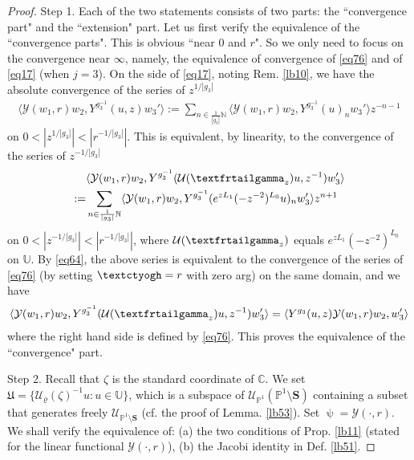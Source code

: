 \documentclass[12pt,a4paper,notitlepage]{article}
\theoremstyle{definition}
\theoremstyle{plain}
\newcommand{\fk}{\mathfrak}
\newcommand{\mc}{\mathcal}
\newcommand{\bk}[1]{\langle {#1}\rangle}
\newcommand{\scr}{\mathscr}
\newcommand{\Ubb}{\mathbb U}
\newcommand{\Cbb}{\mathbb C}
\newcommand{\Nbb}{\mathbb N}
\newcommand{\Pbb}{\mathbb P}
\newcommand{\Sbf}{\mathbf{S}}
\newcommand{\tipaz}{\text{\textctyogh}}
\newcommand{\tipxgamma}{\text{\textfrtailgamma}}
\numberwithin{equation}{subsection}
\begin{document}
\begin{proof}
Step 1. Each of the two statements consists of two parts: the ``convergence part" and the ``extension" part. Let us first verify the equivalence of the ``convergence parts". This is obvious ``near $0$ and $r$". So we only need to focus on the convergence  near $\infty$, namely, the equivalence of convergence of \eqref{eq76} and of \eqref{eq17} (when $j=3$). On the side of \eqref{eq17}, noting Rem. \ref{lb10}, we have the absolute  convergence of the series of $z^{1/|g_3|}$
\begin{align*}
\bk{\mc Y(w_1,r)w_2,Y^{g_3^{-1}}(u,z)w_3'}:=\sum_{n\in\frac 1{|g_3|}\Nbb}	\bk{\mc Y(w_1,r)w_2,Y^{g_3^{-1}}(u)_nw_3'}z^{-n-1}	
\end{align*}
on $0<|z^{1/|g_3|}|<|r^{-1/|g_3|}|$. This is equivalent, by linearity, to the convergence  of the series of $z^{-1/|g_3|}$
\begin{align*}
&\bk{\mc Y(w_1,r)w_2,Y^{g_3^{-1}}(\mc U(\tipxgamma_z)u,z^{-1})w_3'}\\
:=&\sum_{n\in\frac 1{|g_3|}\Nbb}	\bk{\mc Y(w_1,r)w_2,Y^{g_3^{-1}}(e^{zL_1}(-z^{-2})^{L_0}u)_nw_3'}z^{n+1}	
\end{align*}
on $0<|z^{-1/|g_3|}|<|r^{-1/|g_3|}|$, where $\mc U(\tipxgamma_z)$ equals $e^{zL_1}(-z^{-2})^{L_0}$ on $\Ubb$. By \eqref{eq64}, the above series is equivalent to the convergence of the series of \eqref{eq76} (by setting $\tipaz=r$ with zero arg) on the same domain, and we have
\begin{align}
\bk{\mc Y(w_1,r)w_2,Y^{g_3^{-1}}(\mc U(\tipxgamma_z)u,z^{-1})w_3'}=	\bk{Y^{g_3}(u,z)\mc Y(w_1,r)w_2,w_3'}\label{eq83}
\end{align}
where the right hand side is defined by \eqref{eq76}. This proves the equivalence of the ``convergence" part.

Step 2. Recall that $\zeta$ is the standard coordinate of $\Cbb$. We set $\fk U=\{\mc U_\varrho(\zeta)^{-1}u:u\in\Ubb\}$, which is a subspace of $\scr U_{\Pbb^1}(\Pbb^1\setminus\Sbf)$ containing a subset that generates freely $\scr U_{\Pbb^1\setminus\Sbf}$ (cf. the proof of Lemma. \ref{lb53}). Set $\uppsi=\mc Y(\cdot,r)$. We shall verify the equivalence of: (a) the two conditions of Prop. \ref{lb11} (stated for the linear functional $\mc Y(\cdot,r)$), (b) the Jacobi identity in Def. \ref{lb51}.


\end{proof}
\end{document}
